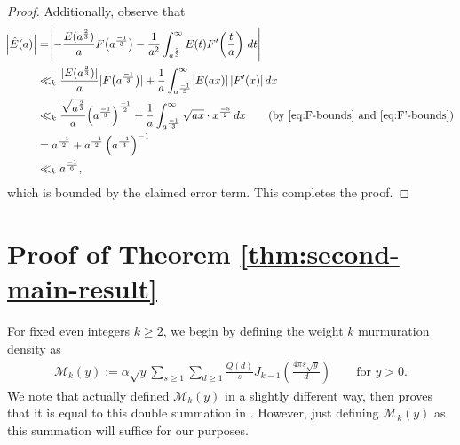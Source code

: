 \documentclass[12pt,letterpaper,reqno]{amsart}
\theoremstyle{plain}
\theoremstyle{definition}
\numberwithin{equation}{section}
\numberwithin{figure}{section}
\numberwithin{table}{section}
\newcommand{\lrabs}[1]{\!\left\lvert #1 \right\lvert}
\newcommand{\lrp}[1]{\!\left(#1\right)}
\newcommand{\M}{\mathcal{M}}
\begin{document}
\begin{proof}
Additionally, observe that
\begin{align}
\lrabs{\hat E(a)}
&= 
\lrabs{
    -\frac{E(a^{\frac{2}{3}})}{a} F\big(a^{\frac{-1}{3}}\big)
    - \frac{1}{a^2} \int_{a^{\frac{2}{3}}}^\infty E(t) F'\lrp{\frac{t}{a}}\,dt
} \\
&\ll_k
\frac{|E(a^{\frac{2}{3}})|}{a} |F\big(a^{\frac{-1}{3}}\big)|
+
\frac{1}{a} 
\int_{a^{\frac{-1}{3}}}^\infty
\lrabs{
    E\lrp{ax}
}
|F'(x)|\,dx
\\
&\ll_k
\frac{\sqrt{a^\frac{2}{3}}}{a} \lrp{a^\frac{-1}{3}}^\frac{-1}{2}
+
\frac{1}{a}
\int_{a^{\frac{-1}{3}}}^\infty
\sqrt{ax}
\cdot
x^\frac{-5}{2}\,dx
\qquad
\text{(by \eqref{eq:F-bounds} and \eqref{eq:F'-bounds})}
\\
&=
a^{\frac{-1}{2}}
+
a^{\frac{-1}{2}}
\left(a^\frac{-1}{3}\right)^{-1}
\\
&\ll_k
a^{\frac{-1}{6}},
\end{align}
which is bounded by the claimed error term. This
completes the proof.
\end{proof}






















\section{Proof of Theorem \ref{thm:second-main-result}}
\label{sec:proof-of-second-main-result}



For fixed even integers $k\ge 2$, we begin by defining the weight $k$ murmuration density as
\begin{align} \label{eq:Mk-bessel}
    \M_k(y)
    :=
    \alpha\sqrt{y}
    \sum_{s\ge1}\sum_{d\ge1}
    \frac{Q(d)}{s}
        J_{k-1}\!\left(\frac{4\pi s\sqrt{y}}{d}\right)
    \qquad \text{for $y>0$}.
\end{align}
We note that \cite{Zubrilina} actually defined $\M_k(y)$ in a slightly different way, then proves that it is equal to this double summation in \cite[Theorem 3]{Zubrilina}. However, just defining $\M_k(y)$ as this summation will suffice for our purposes.
\end{document}

